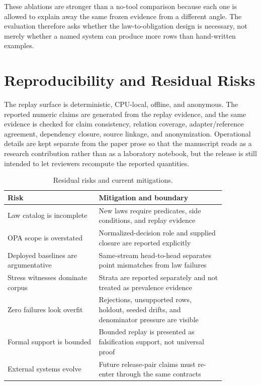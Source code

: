 \documentclass[10pt,conference]{IEEEtran}
\begin{document}
These ablations are stronger than a no-tool comparison because each one is allowed to explain away the same frozen evidence from a different angle.  The evaluation therefore asks whether the law-to-obligation design is necessary, not merely whether a named system can produce more rows than hand-written examples.

\section{Reproducibility and Residual Risks}
The replay surface is deterministic, CPU-local, offline, and anonymous.  The reported numeric claims are generated from the replay evidence, and the same evidence is checked for claim consistency, relation coverage, adapter/reference agreement, dependency closure, source linkage, and anonymization.  Operational details are kept separate from the paper prose so that the manuscript reads as a research contribution rather than as a laboratory notebook, but the release is still intended to let reviewers recompute the reported quantities.

\begin{table}[t]
\centering
\caption{Residual risks and current mitigations.}
\label{tab:residual}
\begin{tabular}{p{0.36\linewidth}p{0.50\linewidth}}
\toprule
Risk & Mitigation and boundary \\
\midrule
Law catalog is incomplete & New laws require predicates, side conditions, and replay evidence \\
OPA scope is overstated & Normalized-decision role and supplied closure are reported explicitly \\
Deployed baselines are argumentative & Same-stream head-to-head separates point mismatches from law failures \\
Stress witnesses dominate corpus & Strata are reported separately and not treated as prevalence evidence \\
Zero failures look overfit & Rejections, unsupported rows, holdout, seeded drifts, and denominator pressure are visible \\
Formal support is bounded & Bounded replay is presented as falsification support, not universal proof \\
External systems evolve & Future release-pair claims must re-enter through the same contracts \\
\bottomrule
\end{tabular}
\end{table}
\end{document}
